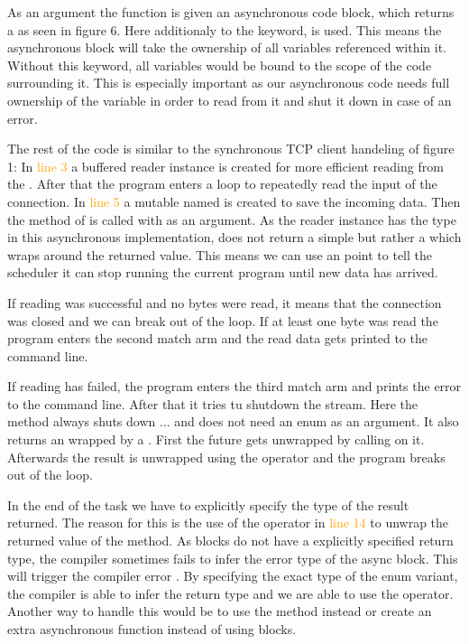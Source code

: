 As an argument the function is given an asynchronous code block, which returns a  as seen in figure 6.
Here additionaly to the  keyword,  is used. This means the asynchronous block will take the
ownership of all variables referenced within it. Without this keyword, all variables would be bound to the scope of the
code surrounding it. This is especially important as our asynchronous code needs full ownership of the 
variable in order to read from it and shut it down in case of an error.

The rest of the code is similar to the synchronous TCP client handeling of figure 1: In \textcolor{orange}{line 3} a
buffered reader instance is created for more efficient reading from the . After that the program enters
a loop to repeatedly read the input of the connection. In \textcolor{orange}{line 5} a mutable  named
 is created to save the incoming data. Then the method  of  is called with
 as an argument. As the reader instance has the type  in this asynchronous
implementation,  does not return a simple  but rather a  which wraps around
the returned value. This means we can use an  point to tell the scheduler it can stop running the current
program until new data has arrived.

If reading was successful and no bytes were read, it means that the connection was closed and we can break out of the
loop. If at least one byte was read the program enters the second match arm and the read data gets printed to the
command line.

If reading has failed, the program enters the third match arm and prints the error to the command line. After that it
tries tu shutdown the stream. Here the  method always shuts down ... and does not need an
enum as an argument. It also returns an  wrapped by a . First the future gets unwrapped by
calling  on it. Afterwards the result is unwrapped using the  operator and the program breaks out
of the loop.

In the end of the task we have to explicitly specify the type of the result returned. The reason for this is the use of
the  operator in \textcolor{orange}{line 14} to unwrap the returned value of the  method. As
 blocks do not have a explicitly specified return type, the compiler sometimes fails to infer the error
type of the async block. This will trigger the compiler error . By specifying the
exact type of the  enum variant, the compiler is able to infer the return type and we are able to use the
 operator. Another way to handle this would be to use the  method instead or create an extra
asynchronous function instead of using  blocks. \cite{async-rust}

